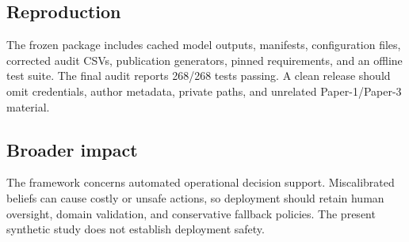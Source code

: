 \subsection{Reproduction}

The frozen package includes cached model outputs, manifests, configuration
files, corrected audit CSVs, publication generators, pinned requirements, and
an offline test suite. The final audit reports 268/268 tests passing. A clean
release should omit credentials, author metadata, private paths, and unrelated
Paper-1/Paper-3 material.

\subsection{Broader impact}

The framework concerns automated operational decision support. Miscalibrated
beliefs can cause costly or unsafe actions, so deployment should retain human
oversight, domain validation, and conservative fallback policies. The present
synthetic study does not establish deployment safety.
